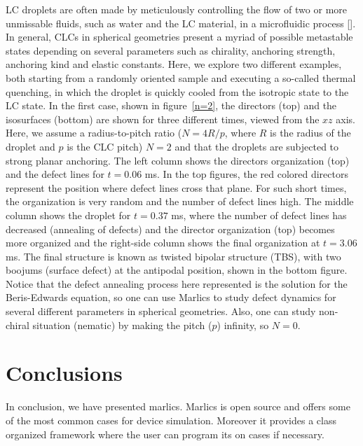 \documentclass[final,5p,times,twocolumn]{elsarticle}
\begin{document}
 LC droplets are often made by meticulously controlling the flow of two or more unmissable fluids, such as water and the LC material, in a microfluidic process []. In general, CLCs in spherical geometries present a myriad of possible metastable states depending on several parameters such as chirality, anchoring strength, anchoring kind and elastic constants. Here, we explore two different examples, both starting from a randomly oriented sample and executing a so-called thermal quenching, in which the droplet is quickly cooled from the isotropic state to the LC state. In the first case, shown in figure~\ref{n=2}, the directors (top) and the isosurfaces (bottom) are shown for three different times, viewed from the $xz$ axis. Here, we assume a radius-to-pitch ratio ($N=4R/p$, where $R$ is the radius of the droplet and $p$ is the CLC pitch) $N=2$ and that the droplets are subjected to strong planar anchoring.  The left column shows the directors organization (top) and the defect lines for $t=0.06$ ms. In the top figures, the red colored directors represent the position where defect lines cross that plane. For such short times, the organization is very random and the number of defect lines high. The middle column shows the droplet for $t=0.37$ ms, where the number of defect lines has decreased (annealing of defects) and the director organization (top) becomes more organized and the right-side column shows the final organization at $t=3.06$ ms. The final structure is known as twisted bipolar structure (TBS), with two boojums (surface defect) at the antipodal position, shown in the bottom figure. Notice that the defect annealing process here represented is the solution for the Beris-Edwards  equation, so one can use Marlics to study defect dynamics for several different parameters in spherical geometries. Also, one can study non-chiral situation (nematic) by making the pitch ($p$) infinity, so $N=0$.



\section{Conclusions}

In conclusion, we have presented marlics. Marlics is open source and
offers some of the most common cases for device simulation. Moreover
it provides a class organized framework where the user can program its
on cases if necessary.  

\label{sec:conclusions}

 \appendix
\end{document}
